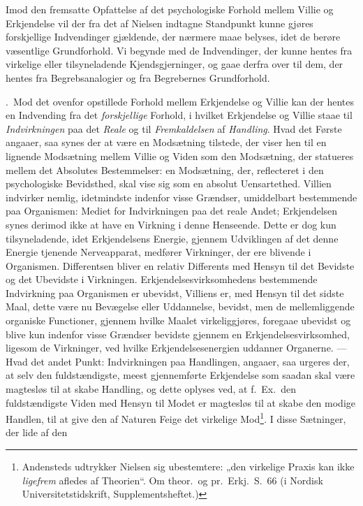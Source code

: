 \documentclass[12pt,a4paper]{book}
\newcommand{\opage}[1]{\marginnote{\footnotesize\textit{[#1]}}}
\begin{document}
Imod den fremsatte Opfattelse af det psychologiske Forhold mellem
Villie og Erkjendelse vil der fra det af Nielsen indtagne Standpunkt
kunne gjøres forskjellige Indvendinger gjældende, der nærmere maae
belyses, idet de berøre væsentlige Grundforhold. Vi begynde med de
Indvendinger, der kunne hentes fra virkelige eller tilsyneladende
Kjendsgjerninger, og gaae derfra over til dem, der hentes fra
Begrebsanalogier og fra Begrebernes Grundforhold.

\medskip

.~Mod det ovenfor opstillede Forhold mellem Erkjendelse og
Villie kan der hentes en Indvending fra det \emph{forskjellige} Forhold, i
hvilket Erkjendelse og Villie staae til \emph{Indvirkningen} paa det \emph{Reale} og til \emph{Fremkaldelsen} af \emph{Handling}. Hvad det Første angaaer, saa synes der
at være en Modsætning tilstede, der viser hen til en lignende
Modsætning mellem Villie og Viden som den Modsætning, der statueres
mellem det Absolutes Bestemmelser: en Modsætning, der, reflecteret i
den psychologiske Bevidsthed, skal vise sig som en absolut
Uensartethed. Villien indvirker nemlig, idetmindste indenfor visse
Grændser, umiddelbart bestemmende paa Organismen: Mediet for
Indvirkningen paa det reale Andet; Erkjendelsen synes derimod ikke at
have en Virkning i denne Henseende. Dette er dog kun tilsyneladende,
idet Erkjendelsens Energie, gjennem Udviklingen af det denne Energie
tjenende Nerveapparat, medfører Virkninger, der ere blivende i
Organismen. Differentsen bliver en relativ Differents med Hensyn til
det Bevidste og det Ubevidste i Virkningen. Erkjendelsesvirksomhedens
bestemmende Indvirkning paa Organismen er ubevidst, Villiens er, med
Hensyn til det sidste Maal, dette være nu Bevægelse eller Uddannelse,
bevidst, men de \opage{141}mellemliggende organiske Functioner, gjennem hvilke
Maalet virkeliggjøres, foregaae ubevidst og blive kun indenfor visse
Grændser bevidste gjennem en Erkjendelsesvirksomhed, ligesom de
Virkninger, ved hvilke Erkjendelsesenergien uddanner Organerne. ---
Hvad det andet Punkt: Indvirkningen paa Handlingen, angaaer, saa
urgeres der, at selv den fuldstændigste, meest gjennemførte Erkjendelse
som saadan skal være magtesløs til at skabe Handling, og dette oplyses
ved, at f.~Ex.\ den fuldstændigste Viden med Hensyn til Modet er
magtesløs til at skabe den modige Handlen, til at give den af Naturen
Feige det virkelige Mod\footnote{Andensteds udtrykker Nielsen sig ubestemtere: „den
virkelige Praxis kan ikke \emph{ligefrem} afledes af Theorien“. Om theor.\ og pr.\ Erkj.\ S.\ 66
(i Nordisk Universitetstidskrift, Supplementsheftet.)}. I disse Sætninger, der lide af den
\end{document}
